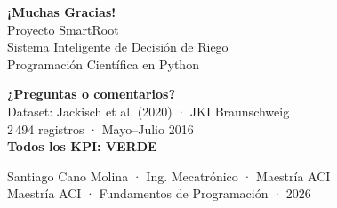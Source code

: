\documentclass[11pt, aspectratio=169]{beamer}
\begin{document}
\begin{frame}[plain]

\vspace{0.4cm}
\begin{center}
{\color{white}\Huge\bfseries ¡Muchas Gracias!}\\[10pt]
{\color{white!85}\large Proyecto SmartRoot}\\[4pt]
{\color{white!70}\normalsize Sistema Inteligente de Decisión de Riego}\\[4pt]
{\color{white!70}\normalsize Programación Científica en Python}

\vspace{0.6cm}
\begin{tcolorbox}[colback=white!15!SmartBlue,colframe=white!30,
    arc=6pt,left=10pt,right=10pt,top=6pt,bottom=6pt,
    width=0.7\textwidth]
\centering
{\color{white}\large\bfseries ¿Preguntas o comentarios?}\\[6pt]
{\color{white!85}\small
Dataset: Jackisch et al. (2020) · JKI Braunschweig\\
2\,494 registros · Mayo--Julio 2016\\
\textbf{Todos los KPI: \textcolor{SmartGreen!70!white}{VERDE}}}
\end{tcolorbox}

\vspace{0.5cm}
{\color{white!80}\small Santiago Cano Molina · Ing. Mecatrónico · Maestría ACI}\\
{\color{white!70}\small Maestría ACI · Fundamentos de Programación · 2026}
\end{center}
\end{frame}


\appendix
\end{document}
